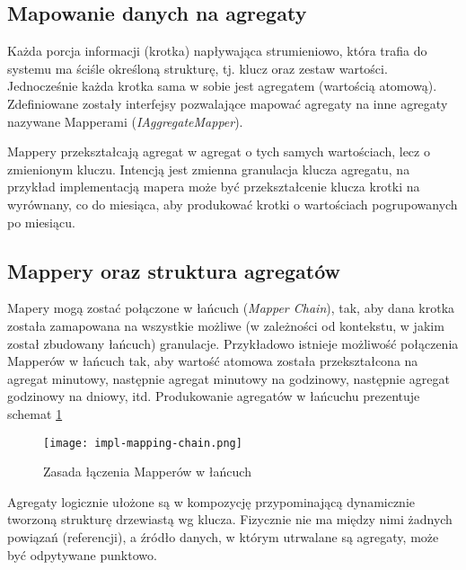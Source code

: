 \subsection{Mapowanie danych na agregaty}

Każda porcja informacji (krotka) napływająca strumieniowo, która trafia do systemu ma ściśle określoną strukturę, tj. klucz oraz zestaw wartości. Jednocześnie każda krotka sama w sobie jest agregatem (wartością atomową). Zdefiniowane zostały interfejsy pozwalające mapować agregaty na inne agregaty nazywane Mapperami (\emph{IAggregateMapper}).

Mappery przekształcają agregat w agregat o tych samych wartościach, lecz o zmienionym kluczu. Intencją jest zmienna granulacja klucza agregatu, na przykład implementacją mapera może być przekształcenie klucza krotki na wyrównany, co do miesiąca, aby produkować krotki o wartościach pogrupowanych po miesiącu.



\subsection{Mappery oraz struktura agregatów}

Mapery mogą zostać połączone w łańcuch (\emph{Mapper Chain}), tak, aby dana krotka została zamapowana na wszystkie możliwe (w zależności od kontekstu, w jakim został zbudowany łańcuch) granulacje. Przykładowo istnieje możliwość połączenia Mapperów w łańcuch tak, aby wartość atomowa została przekształcona na agregat minutowy, następnie agregat minutowy na godzinowy, następnie agregat godzinowy na dniowy, itd. Produkowanie agregatów w łańcuchu prezentuje schemat \ref{fig:impl-mapping-chain}

\begin{figure}[h!]
\centering
\texttt{[image: impl-mapping-chain.png]}
\caption{Zasada łączenia Mapperów w łańcuch}
\label{fig:impl-mapping-chain}
\end{figure}



Agregaty logicznie ułożone są w kompozycję przypominającą dynamicznie tworzoną strukturę drzewiastą wg klucza. Fizycznie nie ma między nimi żadnych powiązań (referencji), a źródło danych, w którym utrwalane są agregaty, może być odpytywane punktowo.

